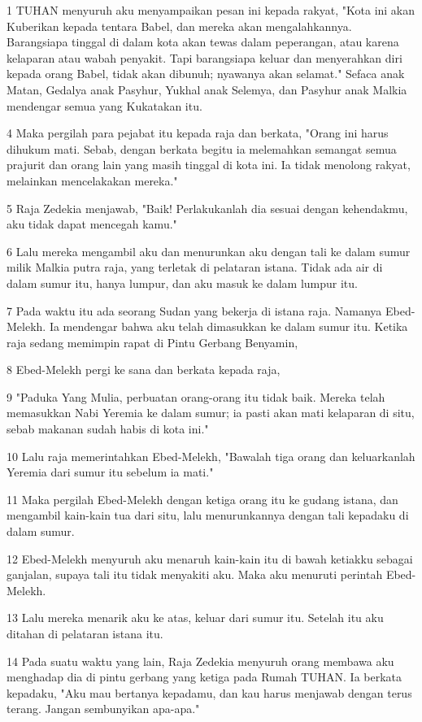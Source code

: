 \par 1 TUHAN menyuruh aku menyampaikan pesan ini kepada rakyat, "Kota ini akan Kuberikan kepada tentara Babel, dan mereka akan mengalahkannya. Barangsiapa tinggal di dalam kota akan tewas dalam peperangan, atau karena kelaparan atau wabah penyakit. Tapi barangsiapa keluar dan menyerahkan diri kepada orang Babel, tidak akan dibunuh; nyawanya akan selamat." Sefaca anak Matan, Gedalya anak Pasyhur, Yukhal anak Selemya, dan Pasyhur anak Malkia mendengar semua yang Kukatakan itu.
\par 4 Maka pergilah para pejabat itu kepada raja dan berkata, "Orang ini harus dihukum mati. Sebab, dengan berkata begitu ia melemahkan semangat semua prajurit dan orang lain yang masih tinggal di kota ini. Ia tidak menolong rakyat, melainkan mencelakakan mereka."
\par 5 Raja Zedekia menjawab, "Baik! Perlakukanlah dia sesuai dengan kehendakmu, aku tidak dapat mencegah kamu."
\par 6 Lalu mereka mengambil aku dan menurunkan aku dengan tali ke dalam sumur milik Malkia putra raja, yang terletak di pelataran istana. Tidak ada air di dalam sumur itu, hanya lumpur, dan aku masuk ke dalam lumpur itu.
\par 7 Pada waktu itu ada seorang Sudan yang bekerja di istana raja. Namanya Ebed-Melekh. Ia mendengar bahwa aku telah dimasukkan ke dalam sumur itu. Ketika raja sedang memimpin rapat di Pintu Gerbang Benyamin,
\par 8 Ebed-Melekh pergi ke sana dan berkata kepada raja,
\par 9 "Paduka Yang Mulia, perbuatan orang-orang itu tidak baik. Mereka telah memasukkan Nabi Yeremia ke dalam sumur; ia pasti akan mati kelaparan di situ, sebab makanan sudah habis di kota ini."
\par 10 Lalu raja memerintahkan Ebed-Melekh, "Bawalah tiga orang dan keluarkanlah Yeremia dari sumur itu sebelum ia mati."
\par 11 Maka pergilah Ebed-Melekh dengan ketiga orang itu ke gudang istana, dan mengambil kain-kain tua dari situ, lalu menurunkannya dengan tali kepadaku di dalam sumur.
\par 12 Ebed-Melekh menyuruh aku menaruh kain-kain itu di bawah ketiakku sebagai ganjalan, supaya tali itu tidak menyakiti aku. Maka aku menuruti perintah Ebed-Melekh.
\par 13 Lalu mereka menarik aku ke atas, keluar dari sumur itu. Setelah itu aku ditahan di pelataran istana itu.
\par 14 Pada suatu waktu yang lain, Raja Zedekia menyuruh orang membawa aku menghadap dia di pintu gerbang yang ketiga pada Rumah TUHAN. Ia berkata kepadaku, "Aku mau bertanya kepadamu, dan kau harus menjawab dengan terus terang. Jangan sembunyikan apa-apa."
